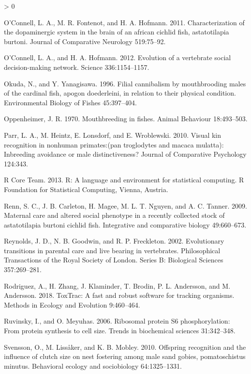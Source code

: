 \documentclass[
  12pt,
]{article}
\newlength{\cslhangindent}
\newenvironment{CSLReferences}[2] %
 {%
  \setlength{\parindent}{0pt}
  \ifodd #1 \everypar{\setlength{\hangindent}{\cslhangindent}}\ignorespaces\fi
  \ifnum #2 > 0
  \setlength{\parskip}{#2\baselineskip}
  \fi
 }%
 {}
\begin{document}
\begin{CSLReferences}{1}{0}
\leavevmode\hypertarget{ref-RN35}{}%
O'Connell, L. A., M. R. Fontenot, and H. A. Hofmann. 2011. Characterization of the dopaminergic system in the brain of an african cichlid fish, astatotilapia burtoni. Journal of Comparative Neurology 519:75--92.

\leavevmode\hypertarget{ref-RN33}{}%
O'Connell, L. A., and H. A. Hofmann. 2012. Evolution of a vertebrate social decision-making network. Science 336:1154--1157.

\leavevmode\hypertarget{ref-RN13}{}%
Okuda, N., and Y. Yanagisawa. 1996. Filial cannibalism by mouthbrooding males of the cardinal fish, apogon doederleini, in relation to their physical condition. Environmental Biology of Fishes 45:397--404.

\leavevmode\hypertarget{ref-RN11}{}%
Oppenheimer, J. R. 1970. Mouthbreeding in fishes. Animal Behaviour 18:493--503.

\leavevmode\hypertarget{ref-RN5}{}%
Parr, L. A., M. Heintz, E. Lonsdorf, and E. Wroblewski. 2010. Visual kin recognition in nonhuman primates:(pan troglodytes and macaca mulatta): Inbreeding avoidance or male distinctiveness? Journal of Comparative Psychology 124:343.

\leavevmode\hypertarget{ref-RN36}{}%
R Core Team. 2013. R: A language and environment for statistical computing. R Foundation for Statistical Computing, Vienna, Austria.

\leavevmode\hypertarget{ref-RN15}{}%
Renn, S. C., J. B. Carleton, H. Magee, M. L. T. Nguyen, and A. C. Tanner. 2009. Maternal care and altered social phenotype in a recently collected stock of astatotilapia burtoni cichlid fish. Integrative and comparative biology 49:660--673.

\leavevmode\hypertarget{ref-RN2}{}%
Reynolds, J. D., N. B. Goodwin, and R. P. Freckleton. 2002. Evolutionary transitions in parental care and live bearing in vertebrates. Philosophical Transactions of the Royal Society of London. Series B: Biological Sciences 357:269--281.

\leavevmode\hypertarget{ref-RN16}{}%
Rodriguez, A., H. Zhang, J. Klaminder, T. Brodin, P. L. Andersson, and M. Andersson. 2018. ToxTrac: A fast and robust software for tracking organisms. Methods in Ecology and Evolution 9:460--464.

\leavevmode\hypertarget{ref-RN27}{}%
Ruvinsky, I., and O. Meyuhas. 2006. Ribosomal protein S6 phosphorylation: From protein synthesis to cell size. Trends in biochemical sciences 31:342--348.

\leavevmode\hypertarget{ref-RN10}{}%
Svensson, O., M. Lissåker, and K. B. Mobley. 2010. Offspring recognition and the influence of clutch size on nest fostering among male sand gobies, pomatoschistus minutus. Behavioral ecology and sociobiology 64:1325--1331.

\end{CSLReferences}
\end{document}
